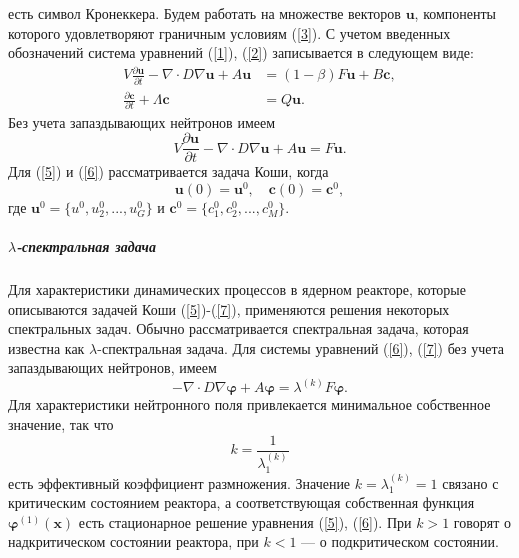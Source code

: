 \documentclass{crm-article}
\begin{document}
есть символ Кронеккера.
Будем работать на множестве векторов $\bm u$, компоненты которого удовлетворяют граничным условиям (\ref{3}).
С учетом введенных обозначений система уравнений (\ref{1}), (\ref{2}) записывается в следующем виде:
\begin{equation}\label{5}
\begin{split}
V \frac{\partial\bm{u}}{\partial t} -\nabla \cdot D \nabla \bm u  + A \bm{u} &=(1-\beta) F \bm{u} + B\bm c,
\\
\frac{\partial\bm c}{\partial t} + \Lambda \bm c &= Q \bm{u}. 
\end{split}
\end{equation}
Без учета запаздывающих нейтронов имеем
\begin{equation}\label{6}
V \frac{\partial\bm{u}}{\partial t} -\nabla \cdot D \nabla \bm{u}  + A \bm{u} = F \bm{u}.
\end{equation}  
Для (\ref{5}) и (\ref{6}) рассматривается задача Коши, когда
\begin{equation}\label{7}
 \bm u(0) = \bm u^0, \quad \bm c(0) = \bm c^0,
\end{equation} 
где $\bm u^0 = \{u^0,  u_2^0, ...,  u_G^0 \}$ и 
$\bm c^0 = \{ c_1^0,  c_2^0, ...,  c_M^0 \}$.

\subparagraph{$\lambda$-спектральная задача}
Для характеристики динамических процессов в ядерном реакторе, которые описываются задачей Коши (\ref{5})-(\ref{7}), применяются решения некоторых спектральных задач.
Обычно рассматривается спектральная задача, которая известна как $\lambda$-спектральная задача.
Для системы уравнений (\ref{6}), (\ref{7}) без учета запаздывающих нейтронов, имеем
\begin{equation}\label{8}
-\nabla \cdot D \nabla \bm \varphi + A  \bm \varphi  = \lambda^{(k)} F \bm \varphi.
\end{equation}
Для характеристики нейтронного поля привлекается минимальное собственное значение, так что
\[
 k = \frac{1}{\lambda^{(k)}_1}  
\] 
есть эффективный коэффициент размножения.
Значение $k = \lambda^{(k)}_1 = 1$ связано с критическим состоянием реактора, а соответствующая собственная функция $\bm{\varphi}^{(1)}(\bm x)$ есть стационарное решение уравнения (\ref{5}), (\ref{6}).
При $k > 1$  говорят о надкритическом состоянии реактора, при $k < 1$  --- о подкритическом состоянии.

\end{document}
